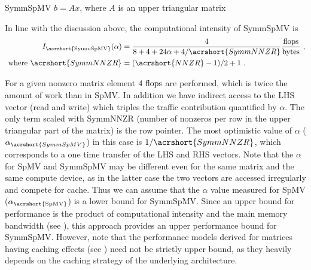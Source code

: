 \begin{algorithm}[t]
	\caption{SymmSpMV $b=Ax$, where $A$ is an upper triangular matrix} 
	\label{alg:SymmSpMV}
	\begin{algorithmic}[1]
			\ENDFOR
		\ENDFOR
	\end{algorithmic}
\end{algorithm}
In line with the discussion above, the computational intensity of \acrshort{SymmSpMV} is
\begin{align}
\label{eq:SymmSpMV_intensity}
I_\mathrm{\acrshort{SymmSpMV}} (\alpha) &= \frac{4}{8+4+24\alpha+4/\acrshort{SymmNNZR}} \frac{\FLOP}{\BYTE}\cma\\
\label{eq:NNZR_symm}
\text{ where  } \acrshort{SymmNNZR} &= (\acrshort{NNZR}-1)/2 + 1\eos
\end{align}

For a given nonzero matrix element $4~\mbox{flops}$ are performed, which is
twice the amount of work than in \acrshort{SpMV}. In addition we have
indirect access to the LHS vector (read and write) which triples the
traffic contribution quantified by $\alpha$\@. The only term scaled
with \acrshort{SymmNNZR} (number of nonzeros per row in the upper
triangular part of the matrix) is the row pointer. The most optimistic
value of $\alpha$ ($\alpha_{\acrshort{SymmSpMV}}$) in this case is
$1/{\acrshort{SymmNNZR}}$, which corresponds to a one time transfer of
the LHS and RHS vectors.  Note that the $\alpha$ for \acrshort{SpMV}
and \acrshort{SymmSpMV} may be different even for the same matrix and
the same compute device, as in the latter case the two vectors are
accessed irregularly and compete for cache. Thus we
can assume that the $\alpha$ value measured for \acrshort{SpMV}
($\alpha_\mathrm{\acrshort{SpMV}}$) is a lower bound
for \acrshort{SymmSpMV}.  Since an upper bound for performance is the
product of computational intensity and the main memory bandwidth
(see ), this approach provides an upper
performance bound for \acrshort{SymmSpMV}.  However, note that the
performance models derived for matrices having caching effects
(see ) need not be strictly upper bound, as
they heavily depends on the caching strategy of the underlying
architecture.
\begin{comment}
 for a given matrix structure:
 \begin{align}
\label{eq:SymmSpMV_performance}
P^{max}_\mathrm{\acrshort{SymmSpMV}}  &= I_\mathrm{\acrshort{SymmSpMV}} (\alpha_\mathrm{\acrshort{SpMV}})  \times b_S
\end{align}
As most matrices have a considerable number of nonzeros per row, we chose $b_S$ to be the optimistic (load-only) value  from~\Cref{tab:test_bed}.
\end{comment}

